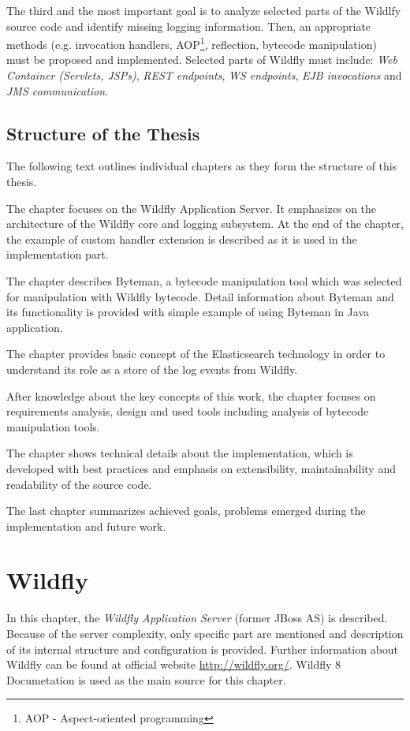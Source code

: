 \documentclass[12pt,oneside]{fithesis2}
\begin{document}
The third and the most important goal is to analyze selected parts of the Wildlfy source code and identify missing logging information. Then, an appropriate methods (e.g. invocation handlers, AOP\footnote{AOP - Aspect-oriented programming}, reflection, bytecode manipulation) must be proposed and implemented. Selected parts of Wildfly must include: \textit{Web Container (Servlets, JSPs)}, \textit{REST endpoints}, \textit{WS endpoints}, \textit{EJB invocations} and \textit{JMS communication}.

\section{Structure of the Thesis}
The following text outlines individual chapters as they form the structure of this thesis.

The chapter  focuses on the Wildfly Application Server. It emphasizes on the architecture of the Wildfly core and logging subsystem. At the end of the chapter, the example of custom handler extension is described as it is used in the implementation part.

The chapter  describes Byteman, a bytecode manipulation tool which was selected for manipulation with Wildfly bytecode. Detail information about Byteman and its functionality is provided with simple example of using Byteman in Java application.

The  chapter provides basic concept of the Elasticsearch technology in order to understand its role as a store of the log events from Wildfly.

After knowledge about the key concepts of this work, the chapter  focuses on requirements analysis, design and used tools including analysis of bytecode manipulation tools.

The chapter  shows technical details about the implementation, which is developed with best practices and emphasis on extensibility, maintainability and readability of the source code.

The last chapter  summarizes achieved goals, problems emerged during the implementation and future work.
    
	    
\chapter{Wildfly}
\label{wildfly_chapter}
In this chapter, the \textit{Wildfly Application Server} (former JBoss AS) is described. Because of the server complexity, only specific part are mentioned and description of its internal structure and configuration is provided. Further information about Wildfly can be found at official website \url{http://wildfly.org/}. Wildfly 8 Documetation \cite{wildfly_doc} is used as the main source for this chapter.
\end{document}

